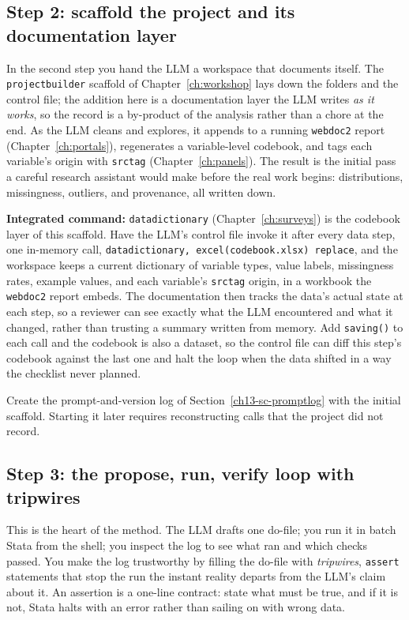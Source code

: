 \subsection{Step 2: scaffold the project and its documentation layer}
In the second step you hand the LLM a workspace that documents itself. The \texttt{projectbuilder} scaffold of Chapter~\ref{ch:workshop} lays down the folders and the control file; the addition here is a documentation layer the LLM writes \emph{as it works}, so the record is a by-product of the analysis rather than a chore at the end. As the LLM cleans and explores, it appends to a running \texttt{webdoc2} report (Chapter~\ref{ch:portals}), regenerates a variable-level codebook, and tags each variable's origin with \texttt{srctag} (Chapter~\ref{ch:panels}). The result is the initial pass a careful research assistant would make before the real work begins: distributions, missingness, outliers, and provenance, all written down.

\begin{kaobox}[frametitle=Package Integration: \texttt{datadictionary} as the living codebook]
\textbf{Integrated command:} \texttt{datadictionary} (Chapter~\ref{ch:surveys}) is the codebook layer of this scaffold. Have the LLM's control file invoke it after every data step, one in-memory call, \texttt{datadictionary, excel(codebook.xlsx) replace}, and the workspace keeps a current dictionary of variable types, value labels, missingness rates, example values, and each variable's \texttt{srctag} origin, in a workbook the \texttt{webdoc2} report embeds. The documentation then tracks the data's actual state at each step, so a reviewer can see exactly what the LLM encountered and what it changed, rather than trusting a summary written from memory. Add \texttt{saving()} to each call and the codebook is also a dataset, so the control file can diff this step's codebook against the last one and halt the loop when the data shifted in a way the checklist never planned.
\end{kaobox}

Create the prompt-and-version log of Section~\ref{ch13-sc-promptlog} with the initial scaffold. Starting it later requires reconstructing calls that the project did not record.

\subsection{Step 3: the propose, run, verify loop with tripwires}
This is the heart of the method. The LLM drafts one do-file; you run it in batch Stata from the shell; you inspect the log to see what ran and which checks passed. You make the log trustworthy by filling the do-file with \emph{tripwires}, \texttt{assert} statements that stop the run the instant reality departs from the LLM's claim about it. An assertion is a one-line contract: state what must be true, and if it is not, Stata halts with an error rather than sailing on with wrong data.

